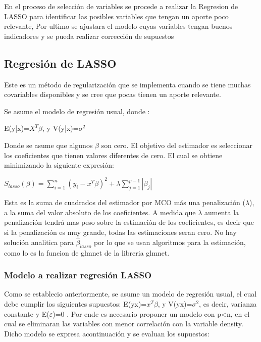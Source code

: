 \documentclass[
]{article}
\begin{document}
En el proceso de selección de variables se procede a realizar la
Regresion de LASSO para identificar las posibles variables que tengan un
aporte poco relevante, Por ultimo se ajustara el modelo cuyas variables
tengan buenos indicadores y se pueda realizar corrección de supuestos

\hypertarget{regresiuxf3n-de-lasso}{%
\subsection{Regresión de LASSO}\label{regresiuxf3n-de-lasso}}

Este es un método de regularización que se implementa cuando se tiene
muchas covariables disponibles y se cree que pocas tienen un aporte
relevante.

Se asume el modelo de regresión usual, donde :

\begin{center}
E(y|x)=$X^T\beta$, y V(y|x)=$\sigma^2$
\end{center}

Donde se asume que algunos \(\beta\) son cero. El objetivo del estimador
es seleccionar los coeficientes que tienen valores diferentes de cero.
El cual se obtiene minimizando la siguiente expresión:

\begin{center}
$S_{lasso}(\beta)=\sum_{i=1}^{n}({y_{i}-x^
T}\beta)^2+\lambda\sum_{j=1}^{p-1}|\beta_{j}|$
\end{center}

Esta es la suma de cuadrados del estimador por MCO más una penalización
(\(\lambda\)), a la suma del valor absoluto de los coeficientes. A
medida que \(\lambda\) aumenta la penalización tendrá mas peso sobre la
estimación de los coeficientes, es decir que si la penalización es muy
grande, todas las estimaciones seran cero. No hay solución analitica
para \(\hat{\beta}_{lasso}\) por lo que se usan algoritmos para la
estimación, como lo es la funcion de glmnet de la libreria glmnet.

\hypertarget{modelo-a-realizar-regresiuxf3n-lasso}{%
\subsubsection{Modelo a realizar regresión
LASSO}\label{modelo-a-realizar-regresiuxf3n-lasso}}

Como se establecio anteriormente, se asume un modelo de regresión usual,
el cual debe cumplir los siguientes supuestos:
E(y\textbar x)=\(x^T\beta\), y V(y\textbar x)=\(\sigma^2\), es decir,
varianza constante y E(\(\varepsilon\))=0 . Por ende es necesario
proponer un modelo con p\textless n, en el cual se eliminaran las
variables con menor correlación con la variable density. Dicho modelo se
expresa acontinuación y se evaluan los supuestos:
\end{document}
